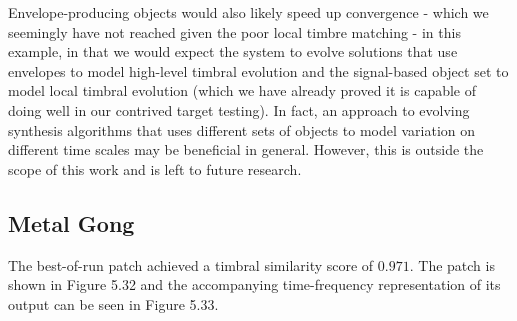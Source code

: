 \documentclass[a4paper,12pt]{report} 	%
\numberwithin{figure}{chapter}
\numberwithin{table}{chapter}
\numberwithin{equation}{chapter}
\begin{document}
\begin{flushleft}
Envelope-producing objects would also likely speed up convergence - which we seemingly have not reached given the poor local timbre matching - in this example, in that we would expect the system to evolve solutions that use envelopes to model high-level timbral evolution and the signal-based object set to model local timbral evolution (which we have already proved it is capable of doing well in our contrived target testing). In fact, an approach to evolving synthesis algorithms that uses different sets of objects to model variation on different time scales may be beneficial in general. However, this is outside the scope of this work and is left to future research.

\clearpage
\subsection{Metal Gong}

The best-of-run patch achieved a timbral similarity score of $0.971$. The patch is shown in Figure 5.32 and the accompanying time-frequency representation of its output can be seen in Figure 5.33.


\end{flushleft}
\end{document}
